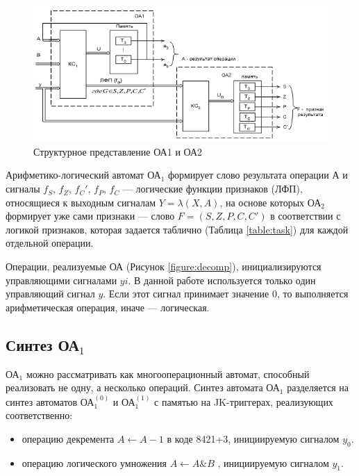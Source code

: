 \begin{figure}[H]
	\includegraphics[scale=0.6]{images/4.png}
	\caption{Структурное представление ОА1 и ОА2}
	\label{figure:srtuct}
\end{figure}

Арифметико-логический автомат ОА$_1$ формирует слово результата операции $А$ и сигналы $f_S$, $f_Z$, $f_C'$, $f_P$, $f_C$ --- логические функции признаков (ЛФП), относящиеся к выходным сигналам $Y=\lambda(X, A)$, на основе которых ОА$_2$ формирует уже сами признаки --- слово $F = (S, Z, P, C, C')$ в соответствии с логикой признаков, которая задается таблично (Таблица \ref{table:task}) для каждой отдельной операции.

Операции, реализуемые ОА (Рисунок \ref{figure:decomp}), инициализируются управляющими сигналами $yi$. В данной работе используется только один управляющий сигнал $y$. Если этот сигнал принимает значение $0$, то выполняется арифметическая операция, иначе --- логическая.

\subsection{Синтез ОА${}_1$}


ОА$_1$ можно рассматривать как многооперационный автомат, способный реализовать не одну, а несколько операций. Синтез автомата ОА$_1$ разделяется на синтез автоматов ОА$^{(0)}_{1}$ и ОА$^{(1)}_{1}$ с памятью на  JK-триггерах, реализующих соответственно: 

\begin{itemize}
	\item операцию декремента $A \leftarrow A-1$ в коде 8421+3, инициируемую сигналом $y_0$.
	\item операцию логического умножения $A \leftarrow A \& B$ , инициируемую сигналом $y_1$.

\end{itemize}

